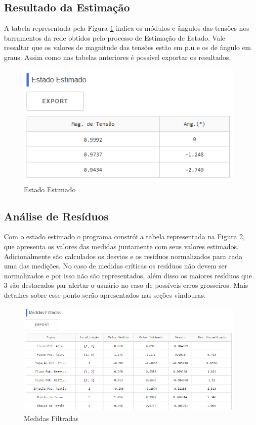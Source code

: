 \documentclass{article}
\begin{document}
\subsection{Resultado da Estimação}
A tabela representada pela Figura \ref{fig:results_SE} indica os módulos e ângulos das tensões nos barramentos da rede obtidos pelo processo de Estimação de Estado. Vale ressaltar que os valores de magnitude das tensões estão em p.u e os de ângulo em graus. Assim como nas tabelas anteriores é possível exportar os resultados.  
\begin{figure}[H]
    \centering
    \includegraphics[scale = .65]{Imagens/Medidas_Estimadas_Ferramenta.PNG}
    \caption{Estado Estimado}
    \label{fig:results_SE}
\end{figure}


\subsection{Análise de Resíduos}
Com o estado estimado o programa constrói a tabela representada na Figura \ref{fig:meds_filters}, que apresenta os valores das medidas juntamente com seus valores estimados. Adicionalmente são calculados os desvios e os resíduos normalizados para cada uma das medições. No caso de medidas críticas os resíduos não devem ser normalizados e por isso não são representados, além disso os maiores resíduos que 3 são destacados par alertar o usuário no caso de possíveis erros grosseiros. Mais detalhes sobre esse ponto serão apresentados nas seções vindouras.
\begin{figure}[H]
    \centering
    \includegraphics[scale = .65]{Imagens/Residuos_Normalizados_Ferramenta.PNG}
    \caption{Medidas Filtradas}
    \label{fig:meds_filters}
\end{figure}
\end{document}
